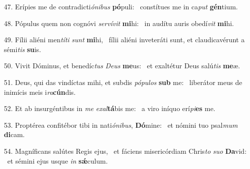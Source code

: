 47. Erípies me de contradicti\textit{ó}\textit{ni}\textit{bus} \textbf{pó}puli: \ast\  constítues me in ca\textit{put} \textbf{gén}tium.\

48. Pópulus quem non cognóvi \textit{ser}\textit{ví}\textit{vit} \textbf{mi}hi: \ast\  in audítu auris obedí\textit{vit} \textbf{mi}hi.\

49. Fílii aliéni men\textit{tí}\textit{ti} \textit{sunt} \textbf{mi}hi, \ast\  fílii aliéni inveteráti sunt, et claudicavérunt a sémi\textit{tis} \textbf{su}is.\

50. Vivit Dóminus, et benedíc\textit{tus} \textit{De}\textit{us} \textbf{me}us: \ast\  et exaltétur Deus salú\textit{tis} \textbf{me}æ.\

51. Deus, qui das vindíctas mihi, et subdis \textit{pó}\textit{pu}\textit{los} \textbf{sub} me: \ast\  liberátor meus de inimícis meis i\textit{ra}\textbf{cún}dis.\

52. Et ab insurgéntibus in \textit{me} \textit{ex}\textit{al}\textbf{tá}bis me: \ast\  a viro iníquo erí\textit{pi}\textbf{es} me.\

53. Proptérea confitébor tibi in nati\textit{ó}\textit{ni}\textit{bus}, \textbf{Dó}mine: \ast\  et nómini tuo psal\textit{mum} \textbf{di}cam.\

54. Magníficans salútes Regis ejus, \dag\  et fáciens misericórdiam Chris\textit{to} \textit{su}\textit{o} \textbf{Da}vid: \ast\  et sémini ejus usque \textit{in} \textbf{sǽ}culum.\

